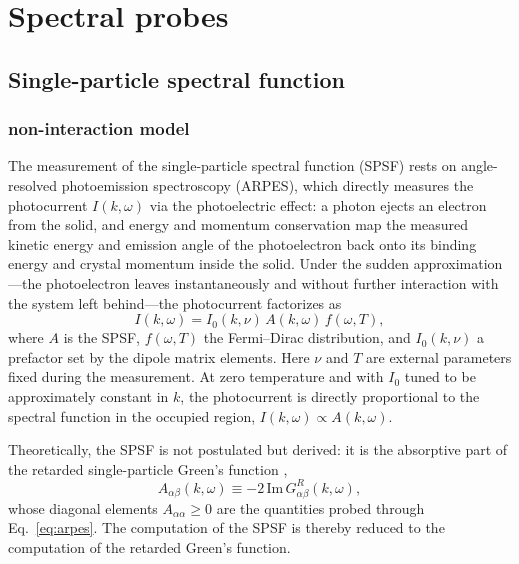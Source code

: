 \documentclass[onecolumn,aps,prl,superscriptaddress,longbibliography]{revtex4-2}
\begin{document}
\section{Spectral probes}\label{sec:probes}
\subsection{Single-particle spectral function}\label{subsec:spsf}
\subsubsection{non-interaction model}\label{subsubsec:spsf_nonint}

The measurement of the single-particle spectral function (SPSF) rests on angle-resolved photoemission spectroscopy (ARPES), which directly measures the photocurrent $I(k,\omega)$ via the photoelectric effect: a photon ejects an electron from the solid, and energy and momentum conservation map the measured kinetic energy and emission angle of the photoelectron back onto its binding energy and crystal momentum inside the solid. Under the sudden approximation \cite{lv2019,chen2020}---the photoelectron leaves instantaneously and without further interaction with the system left behind---the photocurrent factorizes as
\begin{equation}\label{eq:arpes}
  I(k,\omega) = I_0(k,\nu)\,A(k,\omega)\,f(\omega,T),
\end{equation}
where $A$ is the SPSF, $f(\omega,T)$ the Fermi--Dirac distribution, and $I_0(k,\nu)$ a prefactor set by the dipole matrix elements. Here $\nu$ and $T$ are external parameters fixed during the measurement. At zero temperature and with $I_0$ tuned to be approximately constant in $k$, the photocurrent is directly proportional to the spectral function in the occupied region, $I(k,\omega)\propto A(k,\omega)$.

Theoretically, the SPSF is not postulated but derived: it is the absorptive part of the retarded single-particle Green's function \cite{bruusFlensberg2016,tafuri2026,estakeRoy2025},
\begin{equation}\label{eq:spsf_def}
  A_{\alpha\beta}(k,\omega) \equiv -2\,\mathrm{Im}\,G^R_{\alpha\beta}(k,\omega),
\end{equation}
whose diagonal elements $A_{\alpha\alpha}\geq 0$ are the quantities probed through Eq.~\eqref{eq:arpes}. The computation of the SPSF is thereby reduced to the computation of the retarded Green's function.
\end{document}
